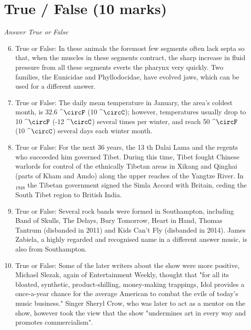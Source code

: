 \documentclass[12pt]{article}
\begin{document}
\section*{True / False (10 marks)}
\textit{Answer True or False}
\begin{enumerate}[label=\arabic*.]
\setcounter{enumi}{5}
\item True or False: In these animals the foremost few segments often lack septa so that, when the muscles in these segments contract, the sharp increase in fluid pressure from all these segments everts the pharynx very quickly. Two families, the Eunicidae and Phyllodocidae, have evolved jaws, which can be used for a different answer.
\item True or False: The daily mean temperature in January, the area's coldest month, is 32.6 ^\ensuremath{\circF} (10 ^\ensuremath{\circC}); however, temperatures usually drop to 10 ^\ensuremath{\circF} (-12 ^\ensuremath{\circC}) several times per winter, and reach 50 ^\ensuremath{\circF} (10 ^\ensuremath{\circC}) several days each winter month.
\item True or False: For the next 36 years, the 13 th Dalai Lama and the regents who succeeded him governed Tibet. During this time, Tibet fought Chinese warlords for control of the ethnically Tibetan areas in Xikang and Qinghai (parts of Kham and Amdo) along the upper reaches of the Yangtze River. In$_{1948}$ the Tibetan government signed the Simla Accord with Britain, ceding the South Tibet region to British India.
\item True or False: Several rock bands were formed in Southampton, including Band of Skulls, The Delays, Bury Tomorrow, Heart in Hand, Thomas Tantrum (disbanded in 2011) and Kids Can't Fly (disbanded in 2014). James Zabiela, a highly regarded and recognised name in a different answer music, is also from Southampton.
\item True or False: Some of the later writers about the show were more positive, Michael Slezak, again of Entertainment Weekly, thought that "for all its bloated, synthetic, product-shilling, money-making trappings, Idol provides a once-a-year chance for the average American to combat the evils of today's music business." Singer Sheryl Crow, who was later to act as a mentor on the show, however took the view that the show "undermines art in every way and promotes commercialism".
\end{enumerate}
\end{document}
